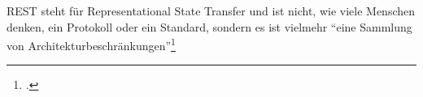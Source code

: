 REST steht für Representational State Transfer und ist nicht, wie viele Menschen denken, ein Protokoll oder ein Standard, sondern es ist vielmehr "`eine Sammlung von Architekturbeschränkungen"'\footcite{Was ist eine REST-API?}
